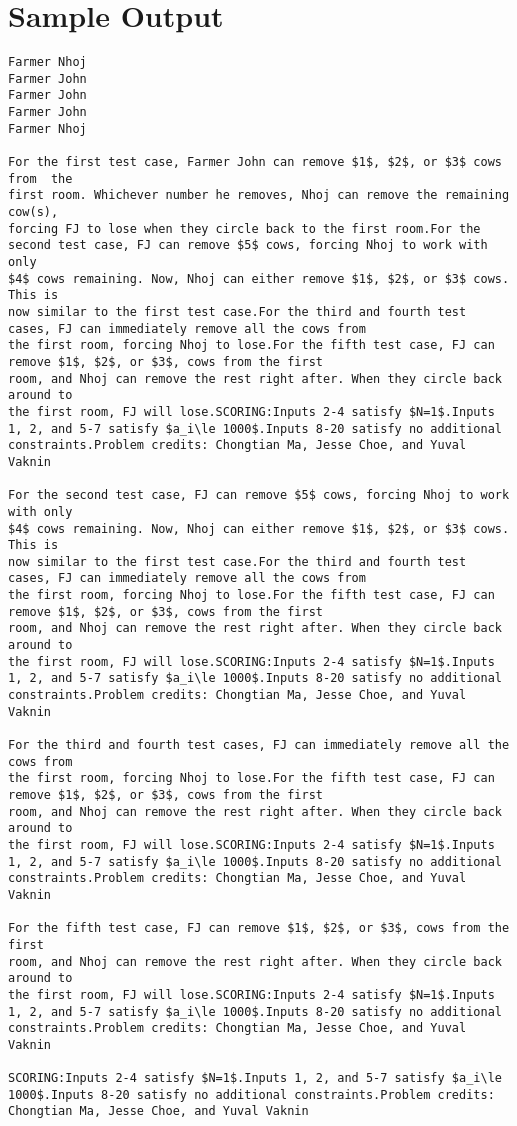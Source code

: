\documentclass[12pt]{article}
\begin{document}
\section*{Sample Output}
\begin{verbatim}
Farmer Nhoj
Farmer John
Farmer John
Farmer John
Farmer Nhoj

For the first test case, Farmer John can remove $1$, $2$, or $3$ cows from  the
first room. Whichever number he removes, Nhoj can remove the remaining cow(s),
forcing FJ to lose when they circle back to the first room.For the second test case, FJ can remove $5$ cows, forcing Nhoj to work with only
$4$ cows remaining. Now, Nhoj can either remove $1$, $2$, or $3$ cows. This is
now similar to the first test case.For the third and fourth test cases, FJ can immediately remove all the cows from
the first room, forcing Nhoj to lose.For the fifth test case, FJ can remove $1$, $2$, or $3$, cows from the first
room, and Nhoj can remove the rest right after. When they circle back around to
the first room, FJ will lose.SCORING:Inputs 2-4 satisfy $N=1$.Inputs 1, 2, and 5-7 satisfy $a_i\le 1000$.Inputs 8-20 satisfy no additional constraints.Problem credits: Chongtian Ma, Jesse Choe, and Yuval Vaknin

For the second test case, FJ can remove $5$ cows, forcing Nhoj to work with only
$4$ cows remaining. Now, Nhoj can either remove $1$, $2$, or $3$ cows. This is
now similar to the first test case.For the third and fourth test cases, FJ can immediately remove all the cows from
the first room, forcing Nhoj to lose.For the fifth test case, FJ can remove $1$, $2$, or $3$, cows from the first
room, and Nhoj can remove the rest right after. When they circle back around to
the first room, FJ will lose.SCORING:Inputs 2-4 satisfy $N=1$.Inputs 1, 2, and 5-7 satisfy $a_i\le 1000$.Inputs 8-20 satisfy no additional constraints.Problem credits: Chongtian Ma, Jesse Choe, and Yuval Vaknin

For the third and fourth test cases, FJ can immediately remove all the cows from
the first room, forcing Nhoj to lose.For the fifth test case, FJ can remove $1$, $2$, or $3$, cows from the first
room, and Nhoj can remove the rest right after. When they circle back around to
the first room, FJ will lose.SCORING:Inputs 2-4 satisfy $N=1$.Inputs 1, 2, and 5-7 satisfy $a_i\le 1000$.Inputs 8-20 satisfy no additional constraints.Problem credits: Chongtian Ma, Jesse Choe, and Yuval Vaknin

For the fifth test case, FJ can remove $1$, $2$, or $3$, cows from the first
room, and Nhoj can remove the rest right after. When they circle back around to
the first room, FJ will lose.SCORING:Inputs 2-4 satisfy $N=1$.Inputs 1, 2, and 5-7 satisfy $a_i\le 1000$.Inputs 8-20 satisfy no additional constraints.Problem credits: Chongtian Ma, Jesse Choe, and Yuval Vaknin

SCORING:Inputs 2-4 satisfy $N=1$.Inputs 1, 2, and 5-7 satisfy $a_i\le 1000$.Inputs 8-20 satisfy no additional constraints.Problem credits: Chongtian Ma, Jesse Choe, and Yuval Vaknin
\end{verbatim}
\end{document}
